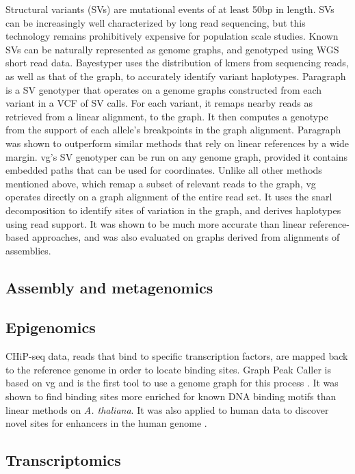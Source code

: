 Structural variants (SVs) are mutational events of at least 50bp in length.
SVs can be increasingly well characterized by long read sequencing, but this technology remains prohibitively expensive for population scale studies.
Known SVs can be naturally represented as genome graphs, and genotyped using WGS short read data.
Bayestyper \cite{sibbesen2018accurate} uses the distribution of kmers from sequencing reads, as well as that of the graph, to accurately identify variant haplotypes.  
Paragraph \cite{chen2019paragraph} is a SV genotyper that operates on a genome graphs constructed from each variant in a VCF of SV calls.
For each variant, it remaps nearby reads as retrieved from a linear alignment, to the graph.
It then computes a genotype from the support of each allele's breakpoints in the graph alignment.
Paragraph was shown to outperform similar methods that rely on linear references by a wide margin.
vg's SV \cite{hickey2019genotyping} genotyper can be run on any genome graph, provided it contains embedded paths that can be used for coordinates.
Unlike all other methods mentioned above, which remap a subset of relevant reads to the graph, vg operates directly on a graph alignment of the entire read set.
It uses the snarl decomposition \cite{paten2018superbubbles} to identify sites of variation in the graph, and derives haplotypes using read support.
It was shown to be much more accurate than linear reference-based approaches, and was also evaluated on graphs derived from alignments of assemblies.

\subsection{Assembly and metagenomics}

\subsection{Epigenomics}

CHiP-seq data, reads that bind to specific transcription factors, are mapped back to the reference genome in order to locate binding sites.  
Graph Peak Caller is based on vg and is the first tool to use a genome graph for this process \cite{grytten2019graph}.
It was shown to find binding sites more enriched for known DNA binding motifs than linear methods on \emph{A. thaliana}.
It was also applied to human data to discover novel sites for enhancers in the human genome \cite{groza2019personalized}. 

\subsection{Transcriptomics}

